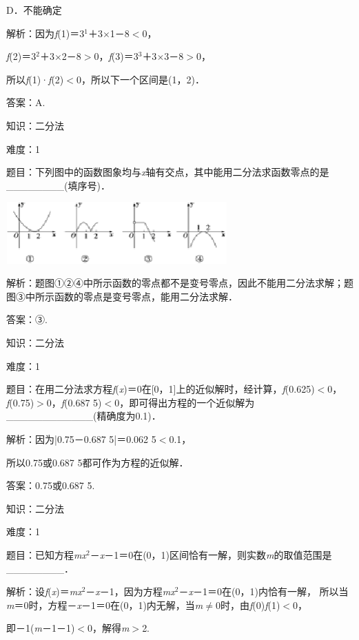 \documentclass{article} %
\begin{document}
D．不能确定

解析：因为\textit{f}(1)＝3${}^{1}$＋3$\mathrm{\times}$1－8$\mathrm{<}$0，

\textit{f}(2)＝3${}^{2}$＋3$\mathrm{\times}$2－8$\mathrm{>}$0，\textit{f}(3)＝3${}^{3}$＋3$\mathrm{\times}$3－8$\mathrm{>}$0，

所以\textit{f}(1)·\textit{f}(2)$\mathrm{<}$0，所以下一个区间是(1，2)．

答案：A.

知识：二分法

难度：1

题目：下列图中的函数图象均与\textit{x}轴有交点，其中能用二分法求函数零点的是\_\_\_\_\_\_\_\_(填序号)．

\includegraphics*[width=3.34in, height=0.93in, keepaspectratio=false]{image72}

解析：题图①②④中所示函数的零点都不是变号零点，因此不能用二分法求解；题图③中所示函数的零点是变号零点，能用二分法求解．

答案：③.

知识：二分法

难度：1

题目：在用二分法求方程\textit{f}(\textit{x})＝0在[0，1]上的近似解时，经计算，\textit{f}(0.625)$\mathrm{<}$0，\textit{f}(0.75)$\mathrm{>}$0，\textit{f}(0.687 5)$\mathrm{<}$0，即可得出方程的一个近似解为\_\_\_\_\_\_\_\_\_\_\_\_(精确度为0.1)．

解析：因为|0.75－0.687 5|＝0.062 5$\mathrm{<}$0.1，

所以0.75或0.687 5都可作为方程的近似解．

答案：0.75或0.687 5.

知识：二分法

难度：1

题目：已知方程\textit{mx}${}^{2}$－\textit{x}－1＝0在(0，1)区间恰有一解，则实数\textit{m}的取值范围是\_\_\_\_\_\_\_\_．

解析：设\textit{f}(\textit{x})＝\textit{mx}${}^{2}$－\textit{x}－1，因为方程\textit{mx}${}^{2}$－\textit{x}－1＝0在(0，1)内恰有一解， 所以当\textit{m}＝0时，方程－\textit{x}－1＝0在(0，1)内无解，当\textit{m}$\mathrm{\neq}$0时，由\textit{f}(0)\textit{f}(1)$\mathrm{<}$0，

即－1(\textit{m}－1－1)$\mathrm{<}$0，解得\textit{m}$\mathrm{>}$2.
\end{document}

